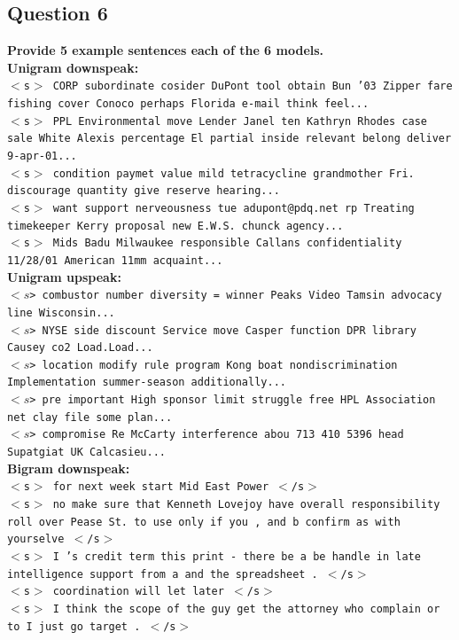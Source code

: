 \documentclass{article} %
\begin{document}
\subsection*{Question 6}

\textbf{Provide 5 example sentences each of the 6 models.}
\\
\textbf{Unigram downspeak:}\\

\texttt{$<$s$>$ CORP subordinate cosider DuPont tool obtain Bun '03 Zipper fare fishing cover Conoco perhaps Florida e-mail think feel...\\
$<$s$>$ PPL Environmental move Lender Janel ten Kathryn Rhodes case sale White Alexis percentage El partial inside relevant belong deliver 9-apr-01...\\
$<$s$>$ condition paymet value mild tetracycline grandmother Fri. discourage quantity give reserve hearing...\\
$<$s$>$ want support nerveousness tue adupont@pdq.net rp Treating timekeeper Kerry proposal new E.W.S. chunck agency...\\
$<$s$>$ Mids Badu Milwaukee responsible Callans confidentiality 11/28/01 American 11mm acquaint...}\\

\textbf{Unigram upspeak:}\\

\texttt{$<s$> combustor number diversity = winner Peaks Video Tamsin advocacy line Wisconsin...\\
$<s$> NYSE side discount Service move Casper function DPR library Causey co2 Load.Load...\\
$<s$> location modify rule program Kong boat nondiscrimination Implementation summer-season additionally...\\
$<s$> pre important High sponsor limit struggle free HPL Association net clay file some plan...\\
$<s$> compromise Re McCarty interference abou 713 410 5396 head Supatgiat UK Calcasieu...}\\

\textbf{Bigram downspeak:}\\

\texttt{$<$s$>$ for next week start Mid East Power $<$/s$>$\\
$<$s$>$ no make sure that Kenneth Lovejoy have overall responsibility roll over Pease St. to use only if you , and b confirm as with yourselve $<$/s$>$\\
$<$s$>$ I 's credit term this print - there be a be handle in late intelligence support from a and the spreadsheet . $<$/s$>$\\
$<$s$>$ coordination will let later $<$/s$>$\\
$<$s$>$ I think the scope of the guy get the attorney who complain or to I just go target . $<$/s$>$}\\
\end{document}

